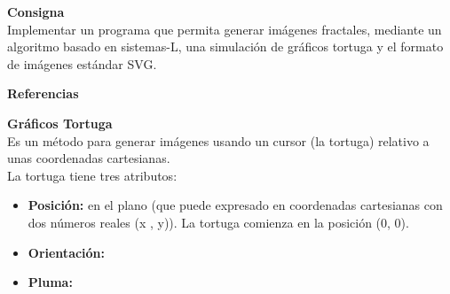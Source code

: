\documentclass{article}
\begin{document}
\begin{description}
	\item \textbf{Consigna} \\ Implementar un programa que permita generar im\'agenes fractales, mediante un algoritmo basado en sistemas-L, una simulaci\'on de gr\'aficos tortuga y el formato de im\'agenes est\'andar SVG. \\[0.5cm]
	\begin{center}
		\textbf{Referencias \\[1cm]}
	\end{center}	 
	 \item \textbf{Gr\'aficos Tortuga} \\[0.5cm] 
		Es un m\'etodo para generar im\'agenes usando un cursor (la tortuga) relativo a unas coordenadas cartesianas. \\ 	
		La tortuga tiene tres atributos: 
		\begin{itemize}
				\item \textbf{Posici\'on:} en el plano (que puede expresado en coordenadas cartesianas con dos n\'umeros reales (x , y)). La tortuga comienza en la posición (0, 0).  \\
				\item \textbf{Orientaci\'on:}\\
				\item \textbf{Pluma:}\\
			\end{itemize}

\end{description}
\end{document}
